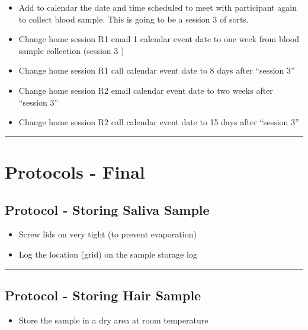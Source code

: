 \documentclass[]{book}
\providecommand{\tightlist}{%
  \setlength{\itemsep}{0pt}\setlength{\parskip}{0pt}}
\begin{document}
\begin{itemize}
\item
  Add to calendar the date and time scheduled to meet with participant again to collect blood sample. This is going to be a session 3 of sorts.
\item
  Change home session R1 email 1 calendar event date to one week from blood sample collection (session 3 )
\item
  Change home session R1 call calendar event date to 8 days after ``session 3''
\item
  Change home session R2 email calendar event date to two weeks after ``session 3''
\item
  Change home session R2 call calendar event date to 15 days after ``session 3''
\end{itemize}

\begin{center}\rule{0.5\linewidth}{0.5pt}\end{center}

\hypertarget{protocols---final-1}{%
\section{Protocols - Final}\label{protocols---final-1}}

\hypertarget{protocol---storing-saliva-sample-1}{%
\subsection{Protocol - Storing Saliva Sample}\label{protocol---storing-saliva-sample-1}}

\begin{itemize}
\item
  Screw lids on very tight (to prevent evaporation)
\item
  Log the location (grid) on the sample storage log
\end{itemize}

\begin{center}\rule{0.5\linewidth}{0.5pt}\end{center}

\hypertarget{protocol---storing-hair-sample-1}{%
\subsection{Protocol - Storing Hair Sample}\label{protocol---storing-hair-sample-1}}

\begin{itemize}
\tightlist
\item
  Store the sample in a dry area at room temperature
\end{itemize}
\end{document}
